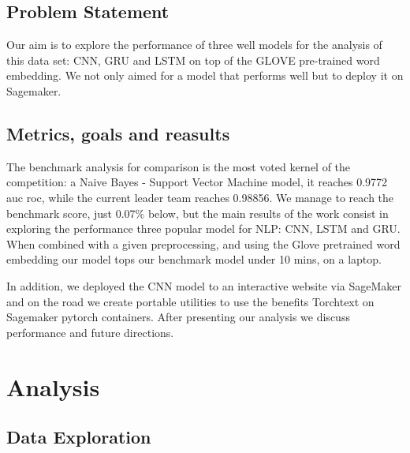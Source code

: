\documentclass{report}
\begin{document}
\section{Problem Statement}

Our aim is to explore the performance of three well models for the analysis of
this data set: CNN, GRU and LSTM on top of the GLOVE pre-trained word embedding. 
We not only aimed for a model that performs well but to deploy it  
on Sagemaker.

\section{Metrics, goals and reasults}

The benchmark analysis for comparison is the most voted
kernel of the competition: a Naive Bayes - Support Vector Machine model, it reaches 0.9772 auc roc,
while the current leader team reaches 0.98856. We manage to reach the benchmark score, just 0.07\% below, but the main 
results of the work consist in exploring the performance three popular model for NLP:  CNN, LSTM and GRU.
When combined with a given preprocessing, and using the Glove pretrained word embedding our model tops 
our benchmark model under 10 mins, on a laptop.

In addition, we deployed the CNN model to an interactive website via SageMaker and on the road 
we create portable utilities to use the benefits Torchtext on Sagemaker pytorch containers. 
After presenting our analysis we discuss performance and future directions. 


\chapter{Analysis}


\section{Data Exploration}
\end{document}
